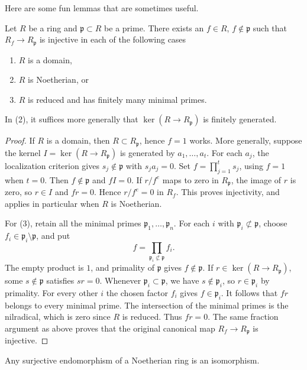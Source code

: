 \noindent
Here are some fun lemmas that are sometimes useful.

\begin{lemma}
\label{lemma-subring-of-local-ring}
Let $R$ be a ring and $\mathfrak p \subset R$ be a prime.
There exists an $f \in R$, $f \not \in \mathfrak p$ such
that $R_f \to R_\mathfrak p$ is injective in each of the
following cases
\begin{enumerate}
\item $R$ is a domain,
\item $R$ is Noetherian, or
\item $R$ is reduced and has finitely many minimal primes.
\end{enumerate}
In (2), it suffices more generally that
$\ker(R\to R_{\mathfrak p})$ is finitely generated.
\end{lemma}

\begin{proof}
If $R$ is a domain, then $R \subset R_\mathfrak p$, hence $f = 1$ works.
More generally, suppose the kernel $I=\ker(R\to R_{\mathfrak p})$
is generated by $a_1,\ldots,a_t$. For each $a_j$, the localization
criterion gives $s_j\notin\mathfrak p$ with $s_ja_j=0$.
Set $f=\prod_{j=1}^ts_j$, using $f=1$ when $t=0$.
Then $f\notin\mathfrak p$ and $fI=0$.
If $r/f^e$ maps to zero in $R_{\mathfrak p}$, the image of $r$
is zero, so $r\in I$ and $fr=0$. Hence $r/f^e=0$ in $R_f$.
This proves injectivity, and applies in particular when $R$ is Noetherian.

\medskip\noindent
For (3), retain all the minimal primes
$\mathfrak p_1,\ldots,\mathfrak p_n$. For each $i$ with
$\mathfrak p_i\not\subset\mathfrak p$, choose
$f_i\in\mathfrak p_i\setminus\mathfrak p$, and put
$$
f=\prod_{\mathfrak p_i\not\subset\mathfrak p}f_i.
$$
The empty product is $1$, and primality of $\mathfrak p$ gives
$f\notin\mathfrak p$. If $r\in\ker(R\to R_{\mathfrak p})$,
some $s\notin\mathfrak p$ satisfies $sr=0$. Whenever
$\mathfrak p_i\subset\mathfrak p$, we have $s\notin\mathfrak p_i$,
so $r\in\mathfrak p_i$ by primality. For every other $i$ the
chosen factor $f_i$ gives $f\in\mathfrak p_i$.
It follows that $fr$ belongs to every minimal prime. The intersection
of the minimal primes is the nilradical, which is zero since $R$
is reduced. Thus $fr=0$. The same fraction argument as above proves
that the original canonical map $R_f\to R_{\mathfrak p}$ is injective.
\end{proof}

\begin{lemma}
\label{lemma-surjective-endo-noetherian-ring-is-iso}
Any surjective endomorphism of a Noetherian ring is an isomorphism.
\end{lemma}

